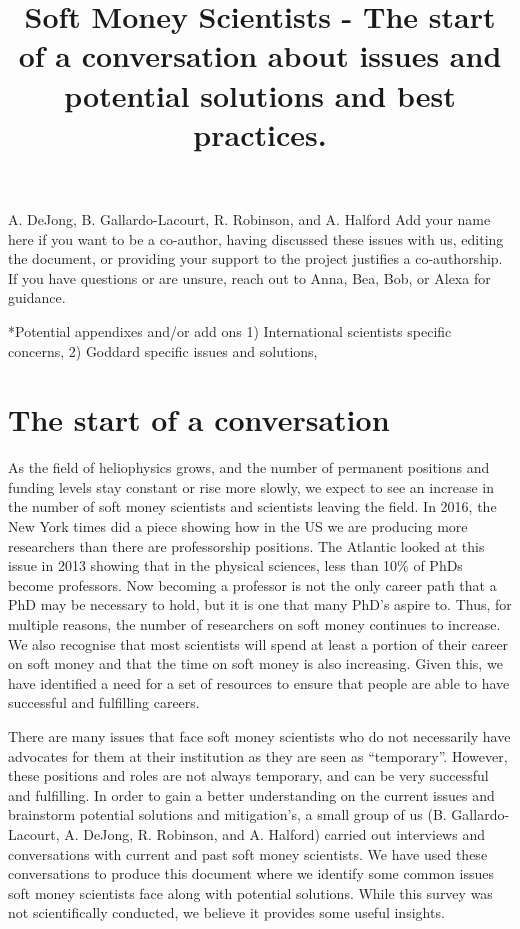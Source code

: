 \documentclass[letterpaper, 12pt]{article}
\title{Soft Money Scientists - The start of a conversation about issues and potential solutions and best practices.}
\begin{document}
\pagestyle{white_paper}
\maketitle

\noindent A. DeJong, B. Gallardo-Lacourt, R. Robinson, and A. Halford \textcolor{CASIIdarkred}{Add your name here if you want to be a co-author, having discussed these issues with us, editing the document, or providing your support to the project justifies a co-authorship. If you have questions or are unsure, reach out to Anna, Bea, Bob, or Alexa for guidance. }

\pagebreak
\tableofcontents
*Potential appendixes and/or add ons 1) International scientists specific concerns, 2) Goddard specific issues and solutions, 
\pagebreak


\section{ The start of a conversation}
As the field of heliophysics grows, and the number of permanent positions and funding levels stay constant or rise more slowly, we expect to see an increase in the number of soft money scientists and scientists leaving the field. In 2016, the New York times did a piece showing how in the US we are producing more researchers than there are professorship positions. The Atlantic looked at this issue in 2013 showing that in the physical sciences, less than 10\% of PhDs become professors. Now becoming a professor is not the only career path that a PhD may be necessary to hold, but it is one that many PhD’s aspire to. Thus, for multiple reasons, the number of researchers on soft money continues to increase. We also recognise that most scientists will spend at least a portion of their career on soft money and that the time on soft money is also increasing. Given this, we have identified a need for a set of resources to ensure that people are able to have successful and fulfilling careers.

There are many issues that face soft money scientists who do not necessarily have advocates for them at their institution as they are seen as “temporary”. However, these positions and roles are not always temporary, and can be very successful and fulfilling. In order to gain a better understanding on the current issues and brainstorm potential solutions and mitigation's, a small group of us (B. Gallardo-Lacourt, A. DeJong, R. Robinson, and A. Halford) carried out interviews and conversations with current and past soft money scientists. We have used these conversations to produce this document where we identify some common issues soft money scientists face along with potential solutions. While this survey was not scientifically conducted, we believe it provides some useful insights.
\end{document}
